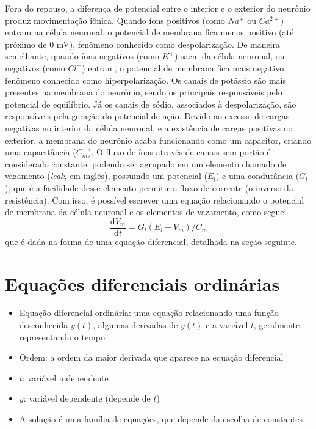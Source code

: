 Fora do repouso, a diferença de potencial entre o interior e o exterior do neurônio produz movimentação iônica. Quando íons positivos (como $Na^+$ ou $Ca^{2+})$ entram na célula neuronal, o potencial de membrana fica menos positivo (até próximo de 0 mV), fenômeno conhecido como despolarização. De maneira semelhante, quando íons negativos (como $K^+$) saem da célula neuronal, ou negativos (como $Cl^-$) entram, o potencial de membrana fica mais negativo, fenômeno conhecido como hiperpolarização. Os canais de potássio são mais presentes na membrana do neurônio, sendo os principais responsáveis pelo potencial de equilíbrio. Já os canais de sódio, associados à despolarização, são responsáveis pela geração do potencial de ação. Devido ao excesso de cargas negativas no interior da célula neuronal, e a existência de cargas positivas no exterior, a membrana do neurônio acaba funcionando como um capacitor, criando uma capacitância ($C_m$). O fluxo de íons através de canais sem portão é considerado constante, podendo ser agrupado em um elemento chamado de vazamento (\textit{leak}, em inglês), possuindo um potencial ($E_l$) e uma condutância ($G_l$), que é a facilidade desse elemento permitir o fluxo de corrente (o inverso da resistência). Com isso, é possível escrever uma equação relacionando o potencial de membrana da célula neuronal e os elementos de vazamento, como segue:
$$
\frac{\mathrm{d}V_m}{\mathrm{d}t}=G_l(E_l-V_m)/C_m
$$
que é dada na forma de uma equação diferencial, detalhada na seção seguinte.

\section{Equações diferenciais ordinárias}\label{sec:eqdif}
\begin{itemize}
	\item Equação diferencial ordinária: uma equação relacionando uma função desconhecida $y(t)$, algumas derivadas de $y(t)$ e a variável $t$, geralmente representando o tempo \cite{adkins_ordinary_2012}
	\item Ordem: a ordem da maior derivada que aparece na equação diferencial
	\item $t$: variável independente
	\item $y$: variável dependente (depende de $t$)
	\item A solução é uma família de equações, que depende da escolha de constantes
\end{itemize}

